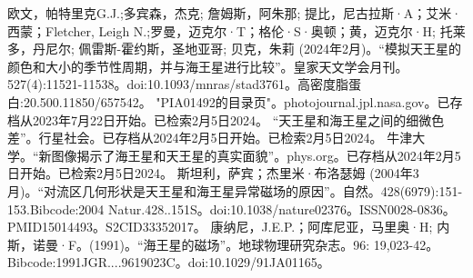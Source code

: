\begin{enumerate}
 欧文，帕特里克G.J.;多宾森，杰克; 詹姆斯，阿朱那; 提比，尼古拉斯·A；艾米·西蒙；Fletcher, Leigh N.;罗曼，迈克尔·T；格伦·S·奥顿；黄，迈克尔·H; 托莱多，丹尼尔; 佩雷斯-霍约斯，圣地亚哥; 贝克，朱莉 (2024年2月)。“模拟天王星的颜色和大小的季节性周期，并与海王星进行比较”。皇家天文学会月刊。527(4):11521-11538。doi:10.1093/mnras/stad3761。高密度脂蛋白:20.500.11850/657542。
 "PIA01492的目录页"。photojournal.jpl.nasa.gov。已存档从2023年7月22日开始。已检索2月5日2024。
 “天王星和海王星之间的细微色差”。行星社会。已存档从2024年2月5日开始。已检索2月5日2024。
 牛津大学。“新图像揭示了海王星和天王星的真实面貌”。phys.org。已存档从2024年2月5日开始。已检索2月5日2024。
 斯坦利，萨宾；杰里米·布洛瑟姆 (2004年3月)。“对流区几何形状是天王星和海王星异常磁场的原因”。自然。428(6979):151-153.Bibcode:2004 Natur.428..151S。doi:10.1038/nature02376。ISSN0028-0836。PMID15014493。S2CID33352017。   
 康纳尼，J.E.P.；阿库尼亚，马里奥·H; 内斯，诺曼·F。(1991)。“海王星的磁场”。地球物理研究杂志。96: 19,023-42。Bibcode:1991JGR....9619023C。doi:10.1029/91JA01165。
\end{enumerate}



